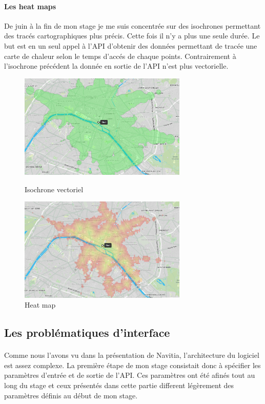 \documentclass[a4paper]{report}
\begin{document}
\paragraph{Les  heat maps} De juin à la fin de mon stage je me suis concentrée sur des isochrones permettant des tracés cartographiques plus précis. Cette fois il n'y a plus une seule durée. Le but est en un seul appel à l'API d'obtenir des données permettant de tracée une carte de chaleur selon le temps d'accés de chaque points. Contrairement à l'isochrone précédent la donnée en sortie de l'API n'est plus vectorielle.

\begin{figure}[H]
	\begin{minipage}[c]{.46\linewidth}
		\includegraphics[width=8cm]{image/iso_vect}
       		\caption{Isochrone vectoriel}
		\label{Isochrone vectoriel}
	\end{minipage} \hfill
	\begin{minipage}[c]{.46\linewidth}
		\includegraphics[width=8cm]{image/heat_map}
       		\caption{Heat map}
		\label{Heat map}
	\end{minipage}
\end{figure}

\subsection{Les problématiques d'interface}

\paragraph{} Comme nous l'avons vu dans la présentation de Navitia, l'architecture du logiciel est assez complexe. La première étape de mon stage consistait donc à spécifier les paramètres d'entrée et de sortie de l'API. Ces paramètres ont été afinés tout au long du stage et ceux présentés dans cette partie different légèrement des paramètres définis au début de mon stage. 
\end{document}
